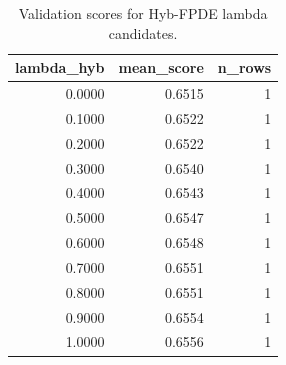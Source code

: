 \begin{table}[t]
\caption{Validation scores for Hyb-FPDE lambda candidates.}
\label{tab:lambda_distribution_computed}
\centering
\begin{tabular}{rrr}
\toprule
lambda\_hyb & mean\_score & n\_rows \\
\midrule
0.0000 & 0.6515 & 1 \\
0.1000 & 0.6522 & 1 \\
0.2000 & 0.6522 & 1 \\
0.3000 & 0.6540 & 1 \\
0.4000 & 0.6543 & 1 \\
0.5000 & 0.6547 & 1 \\
0.6000 & 0.6548 & 1 \\
0.7000 & 0.6551 & 1 \\
0.8000 & 0.6551 & 1 \\
0.9000 & 0.6554 & 1 \\
1.0000 & 0.6556 & 1 \\
\bottomrule
\end{tabular}

\end{table}
